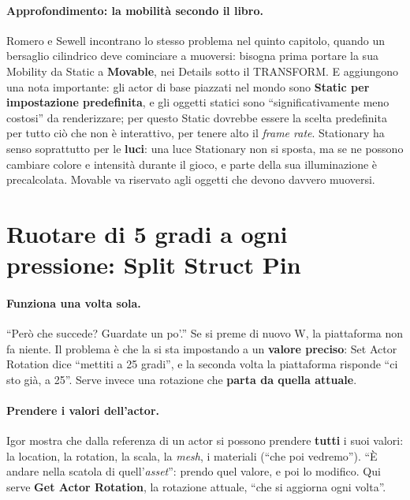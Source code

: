 \paragraph{Approfondimento: la mobilità secondo il libro.} Romero e Sewell incontrano lo
stesso problema nel quinto capitolo, quando un bersaglio cilindrico deve cominciare a
muoversi: bisogna prima portare la sua Mobility da Static a \textbf{Movable}, nei Details
sotto il TRANSFORM. E aggiungono una nota importante: gli actor di base piazzati nel
mondo sono \textbf{Static per impostazione predefinita}, e gli oggetti statici sono
``significativamente meno costosi'' da renderizzare; per questo Static dovrebbe essere
la scelta predefinita per tutto ciò che non è interattivo, per tenere alto il
\emph{frame rate}. Stationary ha senso soprattutto per le \textbf{luci}: una luce
Stationary non si sposta, ma se ne possono cambiare colore e intensità durante il gioco,
e parte della sua illuminazione è precalcolata. Movable va riservato agli oggetti che
devono davvero muoversi.

\section{Ruotare di 5 gradi a ogni pressione: Split Struct Pin}
\label{ue2:sec:split}

\paragraph{Funziona una volta sola.} ``Però che succede? Guardate un po'.'' Se si preme
di nuovo W, la piattaforma non fa niente. Il problema è che la si sta impostando a un
\textbf{valore preciso}: Set Actor Rotation dice ``mettiti a 25 gradi'', e la seconda
volta la piattaforma risponde ``ci sto già, a 25''. Serve invece una rotazione che
\textbf{parta da quella attuale}.

\paragraph{Prendere i valori dell'actor.} Igor mostra che dalla referenza di un actor si
possono prendere \textbf{tutti} i suoi valori: la location, la rotation, la scala, la
\emph{mesh}, i materiali (``che poi vedremo''). ``È andare nella scatola di
quell'\emph{asset}'': prendo quel valore, e poi lo modifico. Qui serve \textbf{Get Actor
Rotation}, la rotazione attuale, ``che si aggiorna ogni volta''.

